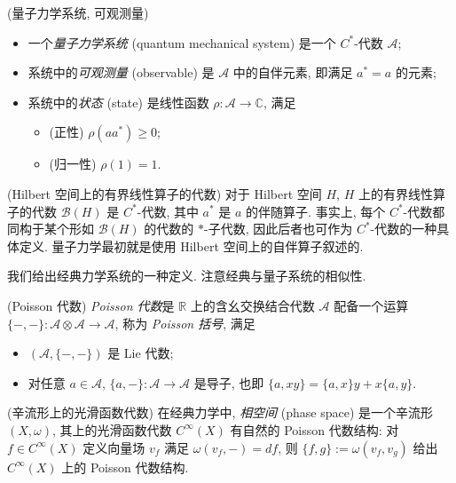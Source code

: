 \begin{definition}
	{(量子力学系统, 可观测量)}
	\begin{itemize}
		\item 一个\emph{量子力学系统} (quantum mechanical system) 是一个 $C^*$-代数 $\mathcal A$;
		\item 系统中的\emph{可观测量} (observable) 是 $\mathcal A$ 中的自伴元素, 即满足 $a^*=a$ 的元素;
		\item 系统中的\emph{状态} (state) 是线性函数 $\rho\colon \mathcal A\to \mathbb{C}$, 满足
		\begin{itemize}
			\item (正性) $\rho(aa^*)\geq 0$;
			\item (归一性) $\rho(1)=1$.
		\end{itemize}
	\end{itemize}
\end{definition}

\begin{example}
	{(Hilbert 空间上的有界线性算子的代数)}
	对于 Hilbert 空间 $H$, $H$ 上的有界线性算子的代数 $\mathcal B(H)$ 是 $C^*$-代数, 其中 $a^*$ 是 $a$ 的伴随算子. 事实上, 每个 $C^*$-代数都同构于某个形如 $\mathcal B(H)$ 的代数的 $*$-子代数, 因此后者也可作为 $C^*$-代数的一种具体定义.
	量子力学最初就是使用 Hilbert 空间上的自伴算子叙述的.
\end{example}

我们给出经典力学系统的一种定义. 注意经典与量子系统的相似性.

\begin{definition}
	{(Poisson 代数)}
	\emph{Poisson 代数}是 $\mathbb{R}$ 上的含幺交换结合代数 $\mathcal A$ 配备一个运算 $\{-,-\}\colon \mathcal A\otimes \mathcal A\to \mathcal A$, 称为 \emph{Poisson 括号}, 满足
	\begin{itemize}
		\item $(\mathcal A,\{-,-\})$ 是 Lie 代数;
		\item 对任意 $a\in \mathcal A$, $\{a,-\}\colon \mathcal A\to \mathcal A$ 是导子, 也即 $\{a,xy\}=\{a,x\}y+x\{a,y\}$.
	\end{itemize}
\end{definition}

\begin{example}
	{(辛流形上的光滑函数代数)}
	在经典力学中, \emph{相空间} (phase space) 是一个辛流形 $(X,\omega)$, 其上的光滑函数代数 $C^\infty (X)$ 有自然的 Poisson 代数结构: 对 $f\in C^\infty (X)$ 定义向量场 $v_f$ 满足 $\omega(v_f,-) = df$, 则 $\{f,g\}:=\omega(v_f,v_g)$ 给出 $C^\infty (X)$ 上的 Poisson 代数结构.
\end{example}

